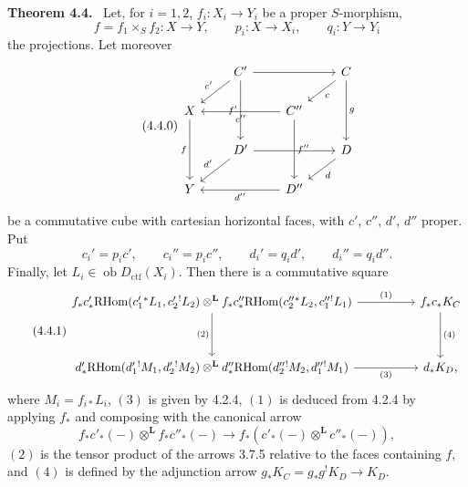 \documentclass[11pt]{article}
\newenvironment{statement}[1]{\par\medskip\noindent\textbf{#1.}\ }{\par\medskip}
\newcommand{\ob}{\operatorname{ob}}
\providecommand{\RHom}{\mathrm{RHom}}
\providecommand{\Dctf}{D_{\mathrm{ctf}}}
\begin{document}
\begin{statement}{Theorem 4.4}
Let, for $i=1,2$, $f_i:X_i\longrightarrow Y_i$ be a proper $S$-morphism,
\[
f=f_1\times_S f_2:X\longrightarrow Y,\qquad
p_i:X\longrightarrow X_i,\qquad q_i:Y\longrightarrow Y_i
\]
the projections. Let moreover
\begin{equation}
\tag{4.4.0}
\begin{tikzcd}[column sep=2.1em,row sep=1.6em]
& C' \arrow[rr] \arrow[dl,"c'"'] \arrow[dd,"f'"'] && C \arrow[dl,"c"] \arrow[dd,"g"] \\
X \arrow[dd,"f"'] && C'' \arrow[ll,"c''"] \arrow[dd,"f''"] \\
& D' \arrow[rr] \arrow[dl,"d'"'] && D \arrow[dl,"d"] \\
Y && D'' \arrow[ll,"d''"]
\end{tikzcd}
\end{equation}
be a commutative cube with cartesian horizontal faces, with $c'$, $c''$, $d'$, $d''$ proper. Put
\[
c_i'=p_i c',\qquad c_i''=p_i c'',\qquad d_i'=q_i d',\qquad d_i''=q_i d''.
\]
Finally, let $L_i\in\ob \Dctf(X_i)$. Then there is a commutative square
\begin{equation}
\tag{4.4.1}
\begin{tikzcd}[column sep=huge,row sep=huge]
f_*c'_*\RHom(c_1'{}^*L_1,c_2'{}^!L_2)\otimes^{\mathbf L}
f_*c''_*\RHom(c_2''{}^*L_2,c_1''{}^!L_1)
 \arrow[r,"(1)"] \arrow[d,"(2)"'] &
f_*c_*K_C \arrow[d,"(4)"] \\
d'_*\RHom(d_1'{}^!M_1,d_2'{}^!M_2)\otimes^{\mathbf L}
d''_*\RHom(d_2''{}^!M_2,d_1''{}^!M_1)
 \arrow[r,"(3)"'] &
d_*K_D ,
\end{tikzcd}
\end{equation}
where $M_i=f_{i*}L_i$, $(3)$ is given by 4.2.4, $(1)$ is deduced from 4.2.4 by applying $f_*$ and composing with the canonical arrow
\[
f_*c'_*(-)\otimes^{\mathbf L} f_*c''_*(-)\longrightarrow f_*(c'_*(-)\otimes^{\mathbf L}c''_*(-)),
\]
$(2)$ is the tensor product of the arrows 3.7.5 relative to the faces containing $f$, and $(4)$ is defined by the adjunction arrow $g_*K_C=g_*g^!K_D\longrightarrow K_D$.
\end{statement}
\end{document}
